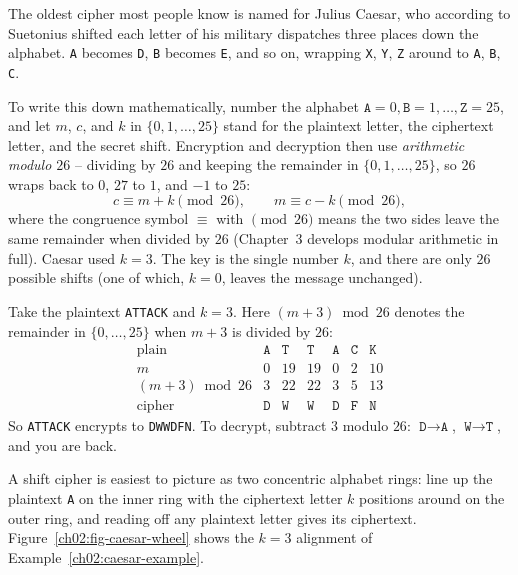 The oldest cipher most people know is named for Julius Caesar, who according to Suetonius
shifted each letter of his military dispatches three places down the alphabet. \texttt{A}
becomes \texttt{D}, \texttt{B} becomes \texttt{E}, and so on, wrapping \texttt{X}, \texttt{Y},
\texttt{Z} around to \texttt{A}, \texttt{B}, \texttt{C}.

To write this down mathematically, number the alphabet $\texttt{A}=0, \texttt{B}=1,
\ldots, \texttt{Z}=25$, and let $m$, $c$, and $k$ in $\{0, 1, \ldots, 25\}$ stand for the
plaintext letter, the ciphertext letter, and the secret shift. Encryption and decryption
then use \emph{arithmetic modulo $26$} -- dividing by $26$ and keeping the remainder in
$\{0, 1, \ldots, 25\}$, so $26$ wraps back to $0$, $27$ to $1$, and $-1$ to $25$:
\[
  c \equiv m + k \pmod{26}, \qquad m \equiv c - k \pmod{26},
\]
where the congruence symbol $\equiv$ with $\pmod{26}$ means the two sides leave the same
remainder when divided by $26$ (Chapter~3 develops modular arithmetic in full). Caesar used
$k=3$. The key is the single number $k$, and there are only $26$ possible shifts (one of
which, $k=0$, leaves the message unchanged).

\begin{example}
\label{ch02:caesar-example}
Take the plaintext \texttt{ATTACK} and $k=3$. Here $(m + 3) \bmod 26$ denotes the remainder
in $\{0, \ldots, 25\}$ when $m + 3$ is divided by $26$:
\[
\begin{array}{c|cccccc}
\text{plain}  & \texttt{A} & \texttt{T} & \texttt{T} & \texttt{A} & \texttt{C} & \texttt{K}\\
m             & 0 & 19 & 19 & 0 & 2 & 10\\
(m+3) \bmod 26  & 3 & 22 & 22 & 3 & 5 & 13\\
\text{cipher} & \texttt{D} & \texttt{W} & \texttt{W} & \texttt{D} & \texttt{F} & \texttt{N}
\end{array}
\]
So \texttt{ATTACK} encrypts to \texttt{DWWDFN}. To decrypt, subtract $3$ modulo $26$:
$\texttt{D} \to \texttt{A}$, $\texttt{W} \to \texttt{T}$, and you are back.
\end{example}

A shift cipher is easiest to picture as two concentric alphabet rings: line up the plaintext
\texttt{A} on the inner ring with the ciphertext letter $k$ positions around on the outer ring,
and reading off any plaintext letter gives its ciphertext. Figure~\ref{ch02:fig-caesar-wheel}
shows the $k=3$ alignment of Example~\ref{ch02:caesar-example}.

